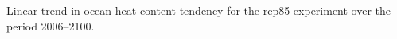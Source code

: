 \label{fig:ohc}
Linear trend in ocean heat content tendency for the rcp85 experiment over the period 2006--2100.